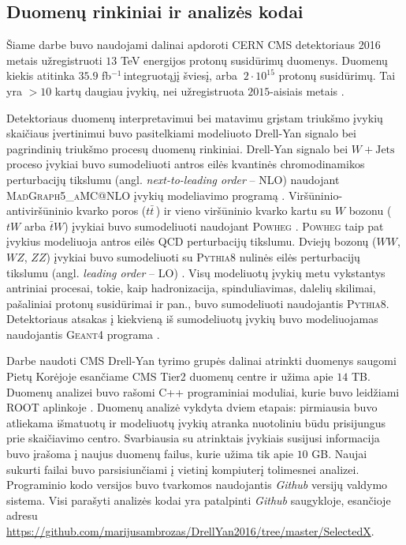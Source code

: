 \documentclass[a4paper, 12pt, oneside]{article}
\newcommand{\WJets}{W\! +\!\mathrm{Jets}}
\newcommand{\invfb}{fb$^{-1}\,$}
\begin{document}
\subsection{Duomenų rinkiniai ir analizės kodai}

Šiame darbe buvo naudojami dalinai apdoroti CERN CMS detektoriaus 2016 metais užregistruoti $13$ TeV
energijos protonų susidūrimų duomenys.
Duomenų kiekis atitinka $35.9$ \invfb integruotąjį šviesį, arba $~2 \cdot 10^{15}$ protonų susidūrimų.
Tai yra $>10$ kartų daugiau įvykių, nei užregistruota $2015$-aisiais metais \cite{DY2019}.

Detektoriaus duomenų interpretavimui bei matavimu grįstam triukšmo įvykių skaičiaus įvertinimui
buvo pasitelkiami modeliuoto Drell-Yan signalo bei pagrindinių triukšmo procesų duomenų rinkiniai.
Drell-Yan signalo bei $\WJets$ proceso įvykiai buvo sumodeliuoti antros eilės kvantinės chromodinamikos
perturbacijų tikslumu  (angl. \textit{next-to-leading order} -- NLO) naudojant \textsc{MadGraph5\_aMC@NLO} įvykių
modeliavimo programą \cite{MG_aMCatNLO}.
Viršūninio-antiviršūninio kvarko poros ($t\bar{t}\,$) ir vieno viršūninio kvarko kartu su $W$ bozonu ($tW$ arba
$\bar{t}W$) įvykiai buvo sumodeliuoti naudojant \textsc{Powheg} \cite{powheg_ttbar, powheg_tW}.
\textsc{Powheg} taip pat įvykius modeliuoja antros eilės QCD perturbacijų tikslumu.
Dviejų bozonų ($WW$, $WZ$, $ZZ$) įvykiai buvo sumodeliuoti su \textsc{Pythia8} nulinės eilės perturbacijų tikslumu
(angl. \textit{leading order} -- LO) \cite{pythia82}.
Visų modeliuotų įvykių metu vykstantys antriniai procesai, tokie, kaip hadronizacija, spinduliavimas, dalelių skilimai,
pašaliniai protonų susidūrimai ir pan., buvo sumodeliuoti naudojantis \textsc{Pythia8}.
Detektoriaus atsakas į kiekvieną iš sumodeliuotų įvykių buvo modeliuojamas naudojantis \textsc{Geant4} programa
\cite{geant4}.

Darbe naudoti CMS Drell-Yan tyrimo grupės dalinai atrinkti duomenys saugomi Pietų Korėjoje esančiame CMS Tier2
duomenų centre ir užima apie $14$ TB.
Duomenų analizei buvo rašomi C++ programiniai moduliai, kurie buvo leidžiami ROOT aplinkoje \cite{ROOTarticle}.
Duomenų analizė vykdyta dviem etapais: pirmiausia buvo atliekama išmatuotų ir modeliuotų įvykių atranka nuotoliniu
būdu prisijungus prie skaičiavimo centro.
Svarbiausia su atrinktais įvykiais susijusi informacija buvo įrašoma į naujus duomenų failus, kurie užima tik
apie $10$ GB.
Naujai sukurti failai buvo parsisiunčiami į vietinį kompiuterį tolimesnei analizei.
Programinio kodo versijos buvo tvarkomos naudojantis \textit{Github} versijų valdymo sistema.
Visi parašyti analizės kodai yra patalpinti \textit{Github} saugykloje, esančioje adresu
\url{https://github.com/marijusambrozas/DrellYan2016/tree/master/SelectedX}.
\end{document}
